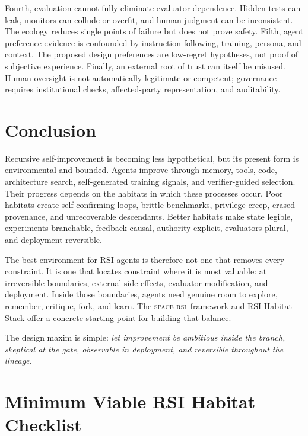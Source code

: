 \documentclass[11pt,a4paper]{article}
\newcommand{\spaceRSI}{\textsc{space-rsi}}
\begin{document}
Fourth, evaluation cannot fully eliminate evaluator dependence. Hidden tests can leak, monitors can collude or overfit, and human judgment can be inconsistent. The ecology reduces single points of failure but does not prove safety. Fifth, agent preference evidence is confounded by instruction following, training, persona, and context. The proposed design preferences are low-regret hypotheses, not proof of subjective experience. Finally, an external root of trust can itself be misused. Human oversight is not automatically legitimate or competent; governance requires institutional checks, affected-party representation, and auditability.

\section{Conclusion}

Recursive self-improvement is becoming less hypothetical, but its present form is environmental and bounded. Agents improve through memory, tools, code, architecture search, self-generated training signals, and verifier-guided selection. Their progress depends on the habitats in which these processes occur. Poor habitats create self-confirming loops, brittle benchmarks, privilege creep, erased provenance, and unrecoverable descendants. Better habitats make state legible, experiments branchable, feedback causal, authority explicit, evaluators plural, and deployment reversible.

The best environment for RSI agents is therefore not one that removes every constraint. It is one that locates constraint where it is most valuable: at irreversible boundaries, external side effects, evaluator modification, and deployment. Inside those boundaries, agents need genuine room to explore, remember, critique, fork, and learn. The \spaceRSI\ framework and RSI Habitat Stack offer a concrete starting point for building that balance.

The design maxim is simple: \emph{let improvement be ambitious inside the branch, skeptical at the gate, observable in deployment, and reversible throughout the lineage.}

\appendix

\section{Minimum Viable RSI Habitat Checklist}
\end{document}
